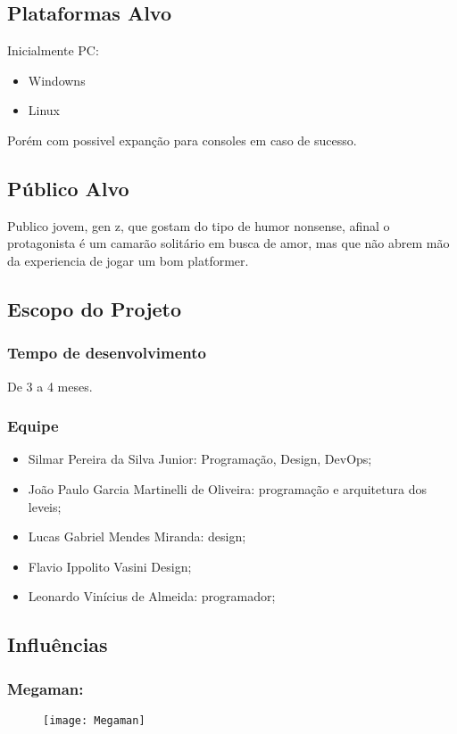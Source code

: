     \subsection{Plataformas Alvo}%
    Inicialmente PC:
        \begin{itemize}
            \item Windowns
            \item Linux
        \end{itemize}
    Porém com possivel expanção para consoles em caso de sucesso.
    \subsection{Público Alvo}%
        Publico jovem, gen z, que gostam do tipo de humor nonsense, afinal o protagonista é um camarão solitário em busca de amor, mas que não abrem mão da experiencia de jogar um bom platformer.

    \subsection{Escopo do Projeto}%
    \subsubsection{Tempo de desenvolvimento}
        De 3 a 4 meses.
    \subsubsection{Equipe}
        \begin{itemize}
            \item Silmar Pereira da Silva Junior: Programação, Design, DevOps;
            \item João Paulo Garcia Martinelli de Oliveira: programação e arquitetura dos leveis;
            \item Lucas Gabriel Mendes Miranda: design;
            \item Flavio Ippolito Vasini Design;
            \item Leonardo Vinícius de Almeida: programador;
        \end{itemize}

    \subsection{Influências}%
        \subsubsection{Megaman:}
        \label{sec:influencias:megaman}
            \begin{figure}[H]
                \texttt{[image: Megaman]}
            \centering
            \end{figure}

